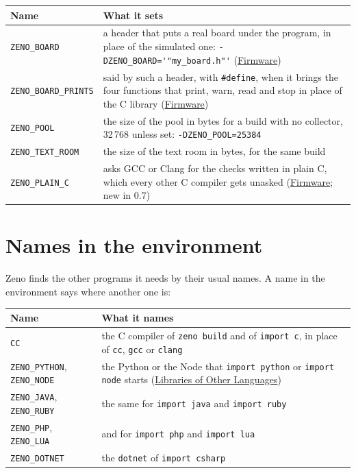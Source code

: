\begin{longtable}{lP{8.6cm}}
\toprule
Name & What it sets \\
\midrule
\endhead
\verb|ZENO_BOARD| & a header that puts a real board under the program,
  in place of the simulated one: \verb|-DZENO_BOARD='"my_board.h"'|
  (\hyperref[ch-firmware]{Firmware}) \\
\verb|ZENO_BOARD_PRINTS| & said by such a header, with
  \verb|#define|, when it brings the four functions that print, warn,
  read and stop in place of the C library
  (\hyperref[ch-firmware]{Firmware}) \\
\verb|ZENO_POOL| & the size of the pool in bytes for a build with no
  collector, 32\,768 unless set: \verb|-DZENO_POOL=25384| \\
\verb|ZENO_TEXT_ROOM| & the size of the text room in bytes, for the same
  build \\
\verb|ZENO_PLAIN_C| & asks GCC or Clang for the checks written in
  plain C, which every other C compiler gets unasked
  (\hyperref[ch-firmware]{Firmware}; new in 0.7) \\
\bottomrule
\end{longtable}

\section{Names in the environment}

Zeno finds the other programs it needs by their usual names. A name
in the environment says where another one is:

\begin{longtable}{lP{8.6cm}}
\toprule
Name & What it names \\
\midrule
\endhead
\verb|CC| & the C compiler of \verb|zeno build| and of
  \verb|import c|, in place of \verb|cc|, \verb|gcc| or \verb|clang| \\
\verb|ZENO_PYTHON|, \verb|ZENO_NODE| & the Python or the Node that
  \verb|import python| or \verb|import node| starts
  (\hyperref[ch-other-languages]{Libraries of Other Languages}) \\
\verb|ZENO_JAVA|, \verb|ZENO_RUBY| & the same for \verb|import java|
  and \verb|import ruby| \\
\verb|ZENO_PHP|, \verb|ZENO_LUA| & and for \verb|import php| and
  \verb|import lua| \\
\verb|ZENO_DOTNET| & the \verb|dotnet| of \verb|import csharp| \\
\bottomrule
\end{longtable}
